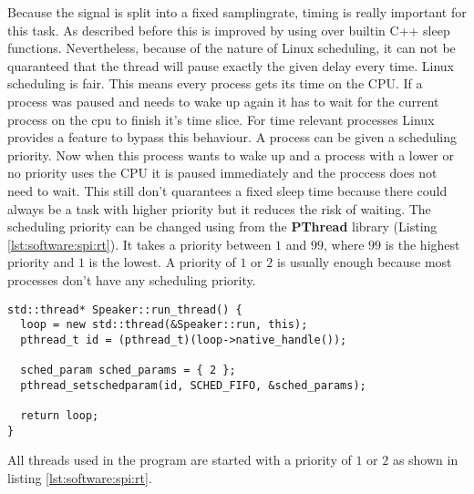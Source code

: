 Because the signal is split into a fixed samplingrate, timing is really important for this task. As described before this is improved by using  over builtin C++ sleep functions. Nevertheless, because of the nature of Linux scheduling, it can not be quaranteed that the thread will pause exactly the given delay every time. Linux scheduling is fair. This means every process gets its time on the CPU. If a process was paused and needs to wake up again it has to wait for the current process on the cpu to finish it's time slice. For time relevant processes Linux provides a feature to bypass this behaviour. A process can be given a scheduling priority. Now when this process wants to wake up and a process with a lower or no priority uses the CPU it is paused immediately and the proccess does not need to wait. This still don't quarantees a fixed sleep time because there could always be a task with higher priority but it reduces the risk of waiting.\p
%
The scheduling priority can be changed using  from the \textbf{PThread} library (Listing \ref{lst:software:spi:rt}). It takes a priority between $1$ and $99$, where $99$ is the highest priority and $1$ is the lowest. A priority of $1$ or $2$ is usually enough because most processes don't have any scheduling priority.
%
\begin{mdframed}
\begin{lstlisting}[caption=Example for creating a thread with realtime priority, label=lst:software:spi:rt]
std::thread* Speaker::run_thread() {
  loop = new std::thread(&Speaker::run, this);
  pthread_t id = (pthread_t)(loop->native_handle());

  sched_param sched_params = { 2 };
  pthread_setschedparam(id, SCHED_FIFO, &sched_params);

  return loop;
}
\end{lstlisting}
\end{mdframed}
%
All threads used in the program are started with a priority of $1$ or $2$ as shown in listing \ref{lst:software:spi:rt}.